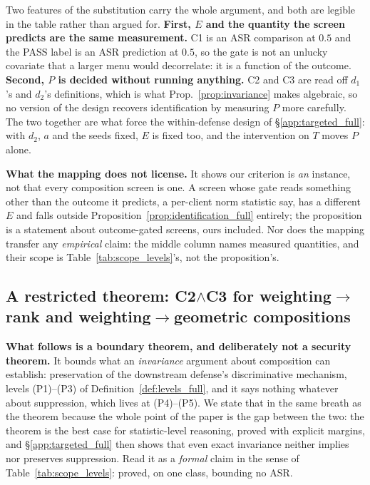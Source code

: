 \documentclass{article}
\begin{document}
Two features of the substitution carry the whole argument, and both are legible in the table rather than argued for. \textbf{First, $E$ and the quantity the screen predicts are the same measurement.} C1 is an ASR comparison at $0.5$ and the PASS label is an ASR prediction at $0.5$, so the gate is not an unlucky covariate that a larger menu would decorrelate: it is a function of the outcome. \textbf{Second, $P$ is decided without running anything.} C2 and C3 are read off $d_1$'s and $d_2$'s definitions, which is what Prop.~\ref{prop:invariance} makes algebraic, so no version of the design recovers identification by measuring $P$ more carefully. The two together are what force the within-defense design of §\ref{app:targeted_full}: with $d_2$, $a$ and the seeds fixed, $E$ is fixed too, and the intervention on $T$ moves $P$ alone.

\noindent \textbf{What the mapping does not license.} It shows our criterion is \emph{an} instance, not that every composition screen is one. A screen whose gate reads something other than the outcome it predicts, a per-client norm statistic say, has a different $E$ and falls outside Proposition~\ref{prop:identification_full} entirely; the proposition is a statement about outcome-gated screens, ours included. Nor does the mapping transfer any \emph{empirical} claim: the middle column names measured quantities, and their scope is Table~\ref{tab:scope_levels}'s, not the proposition's.

\subsection{A restricted theorem: C2$\wedge$C3 for weighting$\to$rank and weighting$\to$geometric compositions}
\label{sec:restricted_theorem}
\label{app:proofs}

\noindent\textbf{What follows is a boundary theorem, and deliberately not a security theorem.} It bounds what an \emph{invariance} argument about composition can establish: preservation of the downstream defense's discriminative mechanism, levels (P1)--(P3) of Definition~\ref{def:levels_full}, and it says nothing whatever about suppression, which lives at (P4)--(P5). We state that in the same breath as the theorem because the whole point of the paper is the gap between the two: the theorem is the best case for statistic-level reasoning, proved with explicit margins, and §\ref{app:targeted_full} then shows that even exact invariance neither implies nor preserves suppression. Read it as a \emph{formal} claim in the sense of Table~\ref{tab:scope_levels}: proved, on one class, bounding no ASR.
\end{document}
